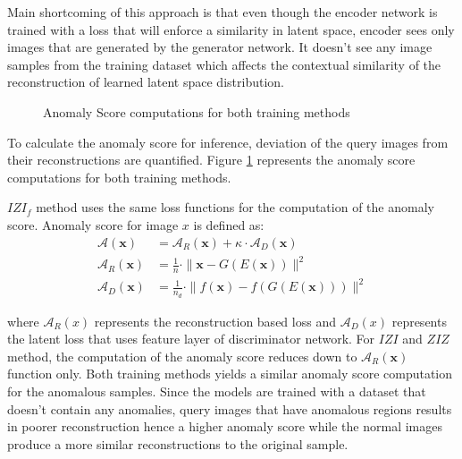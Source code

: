 Main shortcoming of this approach is that even though the encoder network is trained with a loss that will
enforce a similarity in latent space, encoder sees only images that are generated by the generator network.
It doesn't see any image samples from the training dataset which affects the contextual similarity
of the reconstruction of learned latent space distribution. 
\begin{figure}[h!] 
	\hspace*{\fill}%
	\caption{Anomaly Score computations for both training methods \cite{pub.1111824956}}
	\label{fig:fanogan_anomaly_score}
\end{figure}

To calculate the anomaly score for inference, deviation of the query images from their
reconstructions are quantified. Figure \ref{fig:fanogan_anomaly_score} represents the anomaly score
computations for both training methods.

 $IZI_f$ method uses the same loss functions for the computation of the anomaly score. Anomaly score
 for image $x$ is defined as:
\begin{align}
	\mathcal{A}(\mathbf{x})&=\mathcal{A}_{R}(\mathbf{x})+\kappa \cdot \mathcal{A}_{D}(\mathbf{x}) \\[5pt]
	\label{eqn:fanogan_rec_loss}
	\mathcal{A}_{R}(\mathbf{x})&=\frac{1}{n} \cdot\|\mathbf{x}-G(E(\mathbf{x}))\|^{2} \\[5pt]
	\mathcal{A}_{D}(\mathbf{x})&=\frac{1}{n_{d}} \cdot\|f(\mathbf{x})-f(G(E(\mathbf{x})))\|^{2}
\end{align}

where $\mathcal{A}_R (x)$ represents the reconstruction based loss and $\mathcal{A}_{D} (x)$ represents the 
latent loss that uses feature layer of discriminator network.
For $IZI$ and $ZIZ$ method, the computation of the anomaly score reduces down to
$\mathcal{A}_{R}(\mathbf{x})$ function only. Both training methods yields a similar anomaly score
computation for the anomalous samples. Since the models are trained with a dataset that doesn't
contain any anomalies, query images that have anomalous regions results in poorer reconstruction
hence a higher anomaly score while the normal images produce a more similar reconstructions to the
original sample.
 
